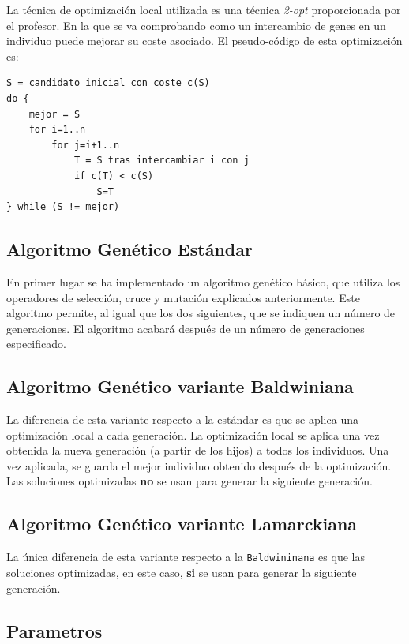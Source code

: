 \bigskip
La técnica de optimización local utilizada es una técnica \textit{2-opt} proporcionada por el profesor. En la que se va comprobando como un intercambio de genes en un individuo puede mejorar su coste asociado. El pseudo-código de esta optimización es:

\begin{lstlisting}
S = candidato inicial con coste c(S) 
do {
	mejor = S
	for i=1..n
		for j=i+1..n
			T = S tras intercambiar i con j 
			if c(T) < c(S)
				S=T
} while (S != mejor)
\end{lstlisting}

\subsection{Algoritmo Genético Estándar}

En primer lugar se ha implementado un algoritmo genético básico, que utiliza los operadores de selección, cruce y mutación explicados anteriormente. Este algoritmo permite, al igual que los dos siguientes, que se indiquen un número de generaciones. El algoritmo acabará después de un número de generaciones especificado.


\subsection{Algoritmo Genético variante Baldwiniana}

La diferencia de esta variante respecto a la estándar es que se aplica una optimización local a cada generación. La optimización local se aplica una vez obtenida la nueva generación (a partir de los hijos) a todos los individuos. Una vez aplicada, se guarda el mejor individuo obtenido después de la optimización. Las soluciones optimizadas \textbf{no} se usan para generar la siguiente generación.

\subsection{Algoritmo Genético variante Lamarckiana}

La única diferencia de esta variante respecto a la \texttt{Baldwininana} es que las soluciones optimizadas, en este caso, \textbf{si} se usan para generar la siguiente generación.


\subsection{Parametros}

